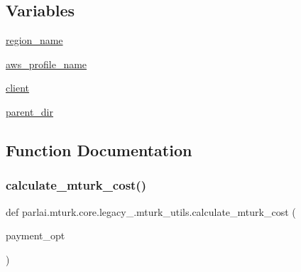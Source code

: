 \subsection*{Variables}
\begin{DoxyCompactItemize}
\item 
\hyperlink{namespaceparlai_1_1mturk_1_1core_1_1legacy__2018_1_1mturk__utils_ab49b9cdcc363c0dccb916988546171ed}{region\+\_\+name}
\item 
\hyperlink{namespaceparlai_1_1mturk_1_1core_1_1legacy__2018_1_1mturk__utils_ad7c6bfcd8f9679dbed0eebe64230458e}{aws\+\_\+profile\+\_\+name}
\item 
\hyperlink{namespaceparlai_1_1mturk_1_1core_1_1legacy__2018_1_1mturk__utils_a35eea1b231a5600c0a82176fd2a023a0}{client}
\item 
\hyperlink{namespaceparlai_1_1mturk_1_1core_1_1legacy__2018_1_1mturk__utils_a90c8f0752571a5e4decf9077aab60c8b}{parent\+\_\+dir}
\end{DoxyCompactItemize}


\subsection{Function Documentation}
\mbox{\label{namespaceparlai_1_1mturk_1_1core_1_1legacy__2018_1_1mturk__utils_a2c1cd16e531345372d5ec5c858bd74f2}} 
\subsubsection{\texorpdfstring{calculate\+\_\+mturk\+\_\+cost()}{calculate\_mturk\_cost()}}
{\footnotesize\ttfamily def parlai.\+mturk.\+core.\+legacy\+\_.\+mturk\+\_\+utils.\+calculate\+\_\+mturk\+\_\+cost (\begin{DoxyParamCaption}\item[{}]{payment\+\_\+opt }\end{DoxyParamCaption})}


